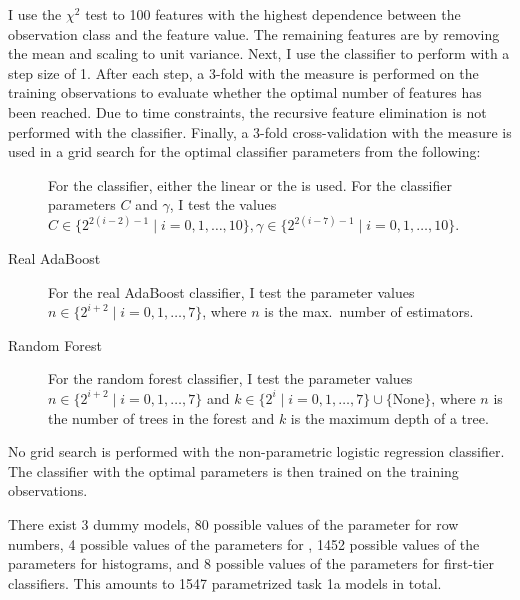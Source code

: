 \begin{description}
    I use the $\chi^2$ test to  100 features with the highest
    dependence between the observation class and the feature value. The
    remaining features are  by removing the mean and scaling
    to unit variance. Next, I use the classifier to perform  with a step size of 1. After each step, a 3-fold
     with the  measure is performed on the
    training observations to evaluate whether the optimal number of features
    has been reached. Due to time constraints, the recursive feature
    elimination is not performed with the  classifier.  Finally, a
    3-fold cross-validation with the  measure is used in a grid
    search for the optimal classifier parameters from the following:
    \begin{description}
      \item[]
        For the  classifier, either the linear or the   is used. For the classifier
        parameters $C$ and $\gamma$, I test the values $C\in\{2^{2(i-2)-1}\mid
        i=0,1,\ldots,10\}, \gamma\in\{2^{2(i-7)-1}\mid i=0,1,\ldots,10\}$.
      \item[Real AdaBoost]
        For the real AdaBoost classifier, I test the parameter values
        $n\in\{2^{i+2}\mid i=0,1,\ldots,7\}$, where $n$ is the max.\ number
        of estimators.
      \item[Random Forest]
        For the random forest classifier, I test the parameter values
        $n\in\{2^{i+2}\mid i=0,1,\ldots,7\}$ and
        $k\in\{2^i\mid i=0,1,\ldots,7\}\cup\{\text{None}\}$,
        where $n$ is the number of trees in the forest and $k$ is the maximum
        depth of a tree.
    \end{description}
    No grid search is performed with the non-parametric logistic regression
    classifier. The classifier with the optimal parameters is then trained on
    the training observations.
\end{description}
There exist 3 dummy models, 80 possible values of the parameter for row numbers,
4 possible values of the parameters for , 1452 possible values of the
parameters for histograms, and 8 possible values of the parameters for
first-tier classifiers. This amounts to 1547 parametrized task 1a models in
total.

